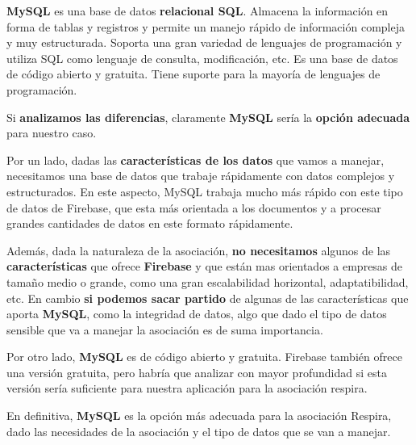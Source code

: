 \textbf{MySQL} es una base de datos \textbf{relacional SQL}. Almacena la información en forma de tablas y registros y permite un manejo rápido de información compleja y muy estructurada. Soporta una gran variedad de lenguajes de programación y utiliza SQL como lenguaje de consulta, modificación, etc. Es una base de datos de código abierto y gratuita. Tiene suporte para la mayoría de lenguajes de programación.

Si \textbf{analizamos las diferencias}, claramente \textbf{MySQL} sería la \textbf{opción adecuada} para nuestro caso.

Por un lado, dadas las \textbf{características de los datos} que vamos a manejar, necesitamos una base de datos que trabaje rápidamente con datos complejos y estructurados. En este aspecto, MySQL trabaja mucho más rápido con este tipo de datos de Firebase, que esta más orientada a los documentos y a procesar grandes cantidades de datos en este formato rápidamente.

Además, dada la naturaleza de la asociación, \textbf{no necesitamos} algunos de las \textbf{características} que ofrece \textbf{Firebase} y que están mas orientados a empresas de tamaño medio o grande, como una gran escalabilidad horizontal, adaptatibilidad, etc. En cambio \textbf{si podemos sacar partido} de algunas de las características que aporta \textbf{MySQL}, como la integridad de datos, algo que dado el tipo de datos sensible que va a manejar la asociación es de suma importancia.

Por otro lado, \textbf{MySQL} es de código abierto y gratuita. Firebase también ofrece una versión gratuita, pero habría que analizar con mayor profundidad si esta versión sería suficiente para nuestra aplicación para la asociación respira.

En definitiva, \textbf{MySQL} es la opción más adecuada para la asociación Respira, dado las necesidades de la asociación y el tipo de datos que se van a manejar.


%
%

